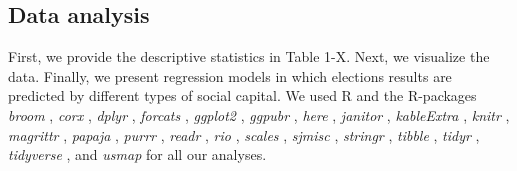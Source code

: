 \documentclass[
  english,
  man]{apa6}
\begin{document}
\hypertarget{data-analysis}{%
\subsection{Data analysis}\label{data-analysis}}

First, we provide the descriptive statistics in Table 1-X. Next, we visualize the data. Finally, we present regression models in which elections results are predicted by different types of social capital.
We used R \autocite[Version 4.0.2;][]{R-base} and the R-packages \emph{broom} \autocite[Version 0.7.1;][]{R-broom}, \emph{corx} \autocite[Version 1.0.6.1;][]{R-corx}, \emph{dplyr} \autocite[Version 1.0.2;][]{R-dplyr}, \emph{forcats} \autocite[Version 0.5.0;][]{R-forcats}, \emph{ggplot2} \autocite[Version 3.3.2;][]{R-ggplot2}, \emph{ggpubr} \autocite[Version 0.4.0;][]{R-ggpubr}, \emph{here} \autocite[Version 0.1;][]{R-here}, \emph{janitor} \autocite[Version 2.0.1;][]{R-janitor}, \emph{kableExtra} \autocite[Version 1.3.1;][]{R-kableExtra}, \emph{knitr} \autocite[Version 1.30;][]{R-knitr}, \emph{magrittr} \autocite[Version 1.5;][]{R-magrittr}, \emph{papaja} \autocite[Version 0.1.0.9997;][]{R-papaja}, \emph{purrr} \autocite[Version 0.3.4;][]{R-purrr}, \emph{readr} \autocite[Version 1.3.1;][]{R-readr}, \emph{rio} \autocite[Version 0.5.16;][]{R-rio}, \emph{scales} \autocite[Version 1.1.1;][]{R-scales}, \emph{sjmisc} \autocite[Version 2.8.5;][]{R-sjmisc}, \emph{stringr} \autocite[Version 1.4.0;][]{R-stringr}, \emph{tibble} \autocite[Version 3.0.3;][]{R-tibble}, \emph{tidyr} \autocite[Version 1.1.2;][]{R-tidyr}, \emph{tidyverse} \autocite[Version 1.3.0;][]{R-tidyverse}, and \emph{usmap} \autocite[Version 0.5.1;][]{R-usmap} for all our analyses.
\end{document}
